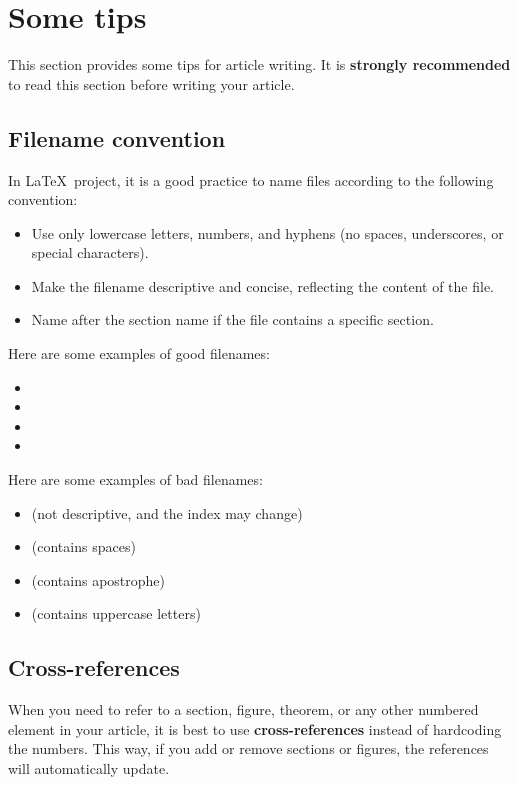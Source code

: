 \section{Some tips}

This section provides some tips for article writing.
It is \textbf{strongly recommended} to read this section before writing your article.

\subsection{Filename convention}

In \LaTeX\ project, it is a good practice to name files according to the following convention:
\begin{itemize}
  \item Use only lowercase letters, numbers, and hyphens (no spaces, underscores, or special characters).
  \item Make the filename descriptive and concise, reflecting the content of the file.
  \item Name after the section name if the file contains a specific section.
\end{itemize}
Here are some examples of good filenames:
\begin{itemize}
  \item {}
  \item {}
  \item {}
  \item {}
\end{itemize}
Here are some examples of bad filenames:
\begin{itemize}
  \item {} (not descriptive, and the index may change)
  \item {} (contains spaces)
  \item {} (contains apostrophe)
  \item {} (contains uppercase letters)
\end{itemize}

\subsection{Cross-references}

When you need to refer to a section, figure, theorem, or any other numbered element in your article, it is best to use \textbf{cross-references} instead of hardcoding the numbers. This way, if you add or remove sections or figures, the references will automatically update.

